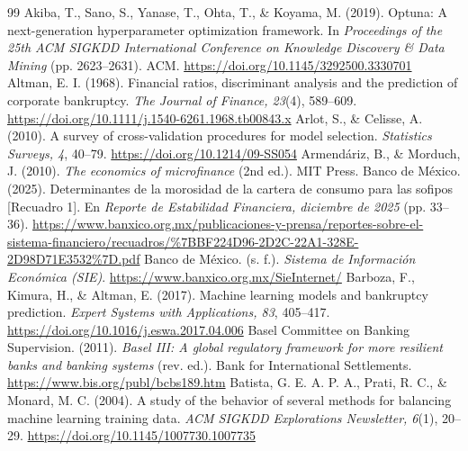 
\begin{thebibliography}{99}
 Akiba, T., Sano, S., Yanase, T., Ohta, T., \& Koyama, M. (2019). Optuna: A next-generation hyperparameter optimization framework. In \textit{Proceedings of the 25th ACM SIGKDD International Conference on Knowledge Discovery \& Data Mining} (pp. 2623--2631). ACM. \url{https://doi.org/10.1145/3292500.3330701}
 Altman, E. I. (1968). Financial ratios, discriminant analysis and the prediction of corporate bankruptcy. \textit{The Journal of Finance, 23}(4), 589--609. \url{https://doi.org/10.1111/j.1540-6261.1968.tb00843.x}
 Arlot, S., \& Celisse, A. (2010). A survey of cross-validation procedures for model selection. \textit{Statistics Surveys, 4}, 40--79. \url{https://doi.org/10.1214/09-SS054}
 Armendáriz, B., \& Morduch, J. (2010). \textit{The economics of microfinance} (2nd ed.). MIT Press.
 Banco de México. (2025). Determinantes de la morosidad de la cartera de consumo para las sofipos [Recuadro 1]. En \textit{Reporte de Estabilidad Financiera, diciembre de 2025} (pp. 33--36). \url{https://www.banxico.org.mx/publicaciones-y-prensa/reportes-sobre-el-sistema-financiero/recuadros/%7BBF224D96-2D2C-22A1-328E-2D98D71E3532%7D.pdf}
 Banco de México. (s. f.). \textit{Sistema de Información Económica (SIE)}. \url{https://www.banxico.org.mx/SieInternet/}%
 Barboza, F., Kimura, H., \& Altman, E. (2017). Machine learning models and bankruptcy prediction. \textit{Expert Systems with Applications, 83}, 405--417. \url{https://doi.org/10.1016/j.eswa.2017.04.006}
 Basel Committee on Banking Supervision. (2011). \textit{Basel III: A global regulatory framework for more resilient banks and banking systems} (rev. ed.). Bank for International Settlements. \url{https://www.bis.org/publ/bcbs189.htm}
 Batista, G. E. A. P. A., Prati, R. C., \& Monard, M. C. (2004). A study of the behavior of several methods for balancing machine learning training data. \textit{ACM SIGKDD Explorations Newsletter, 6}(1), 20--29. \url{https://doi.org/10.1145/1007730.1007735}

\end{thebibliography}
